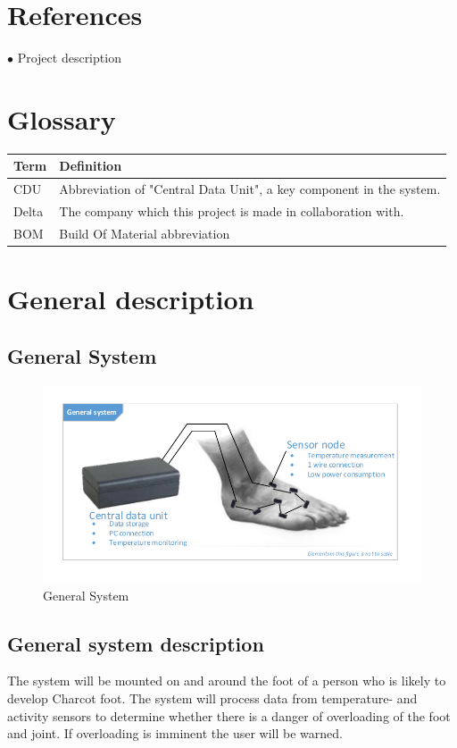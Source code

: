 \section{References}
$\bullet$ Project description

\section{Glossary}
\begin{table}[H]
\centering
\begin{tabular}{|p{4cm}|p{7cm}|}
\hline
Term & Definition\\ \hline
CDU & Abbreviation of "Central Data Unit", a key component in the system. \\ \hline
Delta & The company which this project is made in collaboration with.\\ \hline
BOM & Build Of Material abbreviation\\ \hline
\end{tabular}
\end{table}

\section{General description}

\subsection{General System}
\begin{figure}[H]
	\centering
	\includegraphics[width=1\textwidth]{billeder/GeneralSystem}
	\caption{General System}
\end{figure}

\subsection{General system description}
The system will be mounted on and around the foot of a person who is likely to develop Charcot foot. The system will process data from temperature- and activity sensors to determine whether there is a danger of overloading of the foot and joint. If overloading is imminent the user will be warned.

